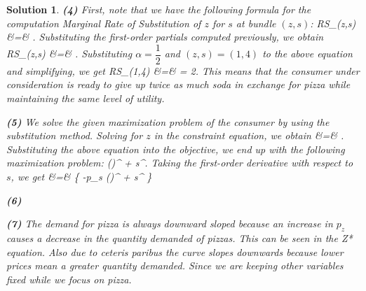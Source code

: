 \documentclass{article} %
\def\eQb#1\eQe{\begin{eqnarray*}#1\end{eqnarray*}}
\theoremstyle{quest}
\newtheorem*{solution}{Solution}
\begin{document}
\begin{solution}
\smallskip

\textbf{(4)}
First, note that we have the following formula for the 
computation Marginal Rate of Substitution of $z$ for $s$ at bundle $(z,s)$:
\eQb
MRS_{}(z,s) &=& .
\eQe
Substituting the first-order partials computed previously, we obtain
\eQb
MRS_{}(z,s) &=& .
\eQe
Substituting $\alpha = \dfrac{1}{2}$ and $(z,s) = (1,4)$ to the above equation and simplifying, we get
\eQb
MRS_{}(1,4) &=&  = 2.
\eQe
This means that the consumer under consideration is ready to give up twice as much soda 
in exchange for pizza while maintaining the same level of utility.

\pagebreak

\textbf{(5)}
We solve the given maximization problem of the consumer by using the substitution method. 
Solving for $z$ in the constraint equation, we obtain
\eQb
z &=& .
\eQe
Substituting the above equation into the objective, we end up with the following 
maximization problem:
\eQb
\underset{ \{ s \} }{\text{max}} \>  ()^{} + 
s^{}. 
\eQe
Taking the first-order derivative with respect to $s$, we get
\eQb
\dfrac{\partial U}{\partial s} &=& 
\{ -p_s \cdot ()^{} + s^{} \}
\eQe

\smallskip

\textbf{(6)}

\smallskip

\textbf{(7)}
The demand for pizza is always downward sloped because an increase in $p_z$ causes 
a decrease in the quantity demanded of pizzas. This can be seen in the Z* equation.
Also due to ceteris paribus the curve slopes downwards because lower prices mean 
a greater quantity demanded. Since we are keeping other variables fixed while we focus on pizza.
\end{solution}
\end{document}
